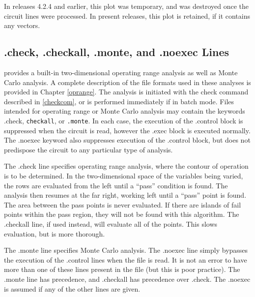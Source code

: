 In releases 4.2.4 and earlier, this plot was temporary, and was
destroyed once the circuit lines were processed.  In present releases,
this plot is retained, if it contains any vectors.


\subsection{{\vt .check}, {\vt .checkall}, {\vt .monte}, and {\vt .noexec}
 Lines}

{\WRspice} provides a built-in two-dimensional operating range analysis
as well as Monte Carlo analysis.  A complete description of the file
formats used in these analyses is provided in Chapter \ref{oprange}.  The
analysis is initiated with the {\cb check} command described in
\ref{checkcom}, or is performed immediately if in batch mode.  Files
intended for operating range or Monte Carlo analysis may contain the
keywords {\vt .check}, {\tt checkall}, or {\tt .monte}.  In each case,
the execution of the {\vt .control} block is suppressed when the
circuit is read, however the {\vt .exec} block is executed normally. 
The {\vt .noexec} keyword also suppresses execution of the {\vt
.control} block, but does not predispose the circuit to any particular
type of analysis.

The {\vt .check} line specifies operating range analysis, where the
contour of operation is to be determined.  In the two-dimensional
space of the variables being varied, the rows are evaluated from the
left until a ``pass'' condition is found.  The analysis then resumes
at the far right, working left until a ``pass'' point is found.  The
area between the pass points is never evaluated.  If there are islands
of fail points within the pass region, they will not be found with
this algorithm.  The {\vt .checkall} line, if used instead, will
evaluate all of the points.  This slows evaluation, but is more
thorough.

The {\vt .monte} line specifies Monte Carlo analysis.  The {\vt
.noexec} line simply bypasses the execution of the {\vt .control}
lines when the file is read.  It is not an error to have more than one
of these lines present in the file (but this is poor practice).  The
{\vt .monte} line has precedence, and {\vt .checkall} has precedence
over {\vt .check}.  The {\vt .noexec} is assumed if any of the other
lines are given.


